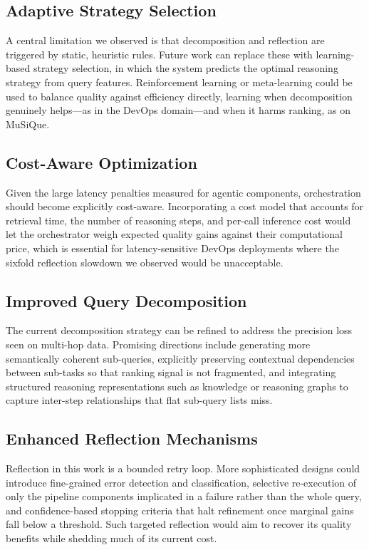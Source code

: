 \documentclass[conference]{IEEEtran}
\begin{document}
\subsection{Adaptive Strategy Selection}
A central limitation we observed is that decomposition and reflection are triggered by static, heuristic rules. Future work can replace these with learning-based strategy selection, in which the system predicts the optimal reasoning strategy from query features. Reinforcement learning or meta-learning could be used to balance quality against efficiency directly, learning when decomposition genuinely helps---as in the DevOps domain---and when it harms ranking, as on MuSiQue.

\subsection{Cost-Aware Optimization}
Given the large latency penalties measured for agentic components, orchestration should become explicitly cost-aware. Incorporating a cost model that accounts for retrieval time, the number of reasoning steps, and per-call inference cost would let the orchestrator weigh expected quality gains against their computational price, which is essential for latency-sensitive DevOps deployments where the sixfold reflection slowdown we observed would be unacceptable.

\subsection{Improved Query Decomposition}
The current decomposition strategy can be refined to address the precision loss seen on multi-hop data. Promising directions include generating more semantically coherent sub-queries, explicitly preserving contextual dependencies between sub-tasks so that ranking signal is not fragmented, and integrating structured reasoning representations such as knowledge or reasoning graphs to capture inter-step relationships that flat sub-query lists miss.

\subsection{Enhanced Reflection Mechanisms}
Reflection in this work is a bounded retry loop. More sophisticated designs could introduce fine-grained error detection and classification, selective re-execution of only the pipeline components implicated in a failure rather than the whole query, and confidence-based stopping criteria that halt refinement once marginal gains fall below a threshold. Such targeted reflection would aim to recover its quality benefits while shedding much of its current cost.
\end{document}
